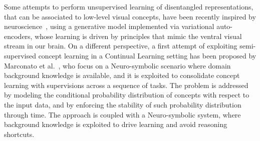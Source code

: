 %
%
%
Some attempts to perform unsupervised learning of disentangled representations, that can be associated to low-level visual concepts, have been recently inspired by neuroscience~\cite{higgins2016early}, using a generative model implemented via variational auto-encoders, whose learning is driven by principles that mimic the ventral visual stream in our brain.
%
On a different perspective, a first attempt of exploiting semi-supervised concept learning in a Continual Learning setting has been proposed by Marconato et al.~\cite{marconato2023neuro}, who focus on a Neuro-symbolic scenario where domain background knowledge is available, and it is exploited to consolidate concept learning with supervisions across a sequence of tasks. The problem is addressed by modeling the conditional probability distribution of concepts with respect to the input data, and by enforcing the stability of such probability distribution through time. The approach is coupled with a Neuro-symbolic system, where background knowledge is exploited to drive learning and avoid reasoning shortcuts.


